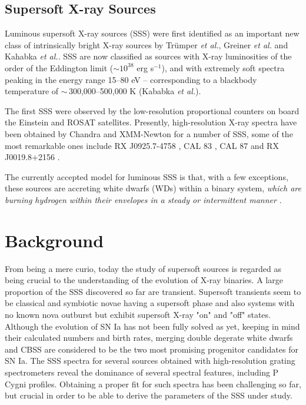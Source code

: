         \subsection{Supersoft X-ray Sources} \label{introduction:introduction:sss}
        	Luminous supersoft X-ray sources (SSS) were first identified as an important new class of intrinsically bright X-ray sources by Tr{\"u}mper \emph{et al.}\cite{trumper91}, Greiner \emph{et al.}\cite{greiner91} and Kahabka \emph{et al.}\cite{kahabka06}. SSS are now classified as sources with X-ray luminosities of the order of the Eddington limit ($\sim 10^{38}$ erg s$^{-1}$), and with extremely soft spectra peaking in the energy range 15--80 eV -- corresponding to a blackbody temperature of $\sim\,$300,000--500,000 K (Kababka \emph{et al.})\cite{kahabka97}.
        	
        	The first SSS were observed by the low-resolution proportional counters on board the Einstein and ROSAT satellites. Presently, high-resolution X-ray spectra have been obtained by Chandra and XMM-Newton for a number of SSS, some of the most remarkable ones include RX J0925.7-4758 \cite{bearda2002,motch2002}, CAL 83 \cite{lanz2005}, CAL 87 \cite{orio2004} and RX J0019.8+2156 \cite{schwarz2004}.
        	
        	The currently accepted model for luminous SSS is that, with a few exceptions, these sources are accreting white dwarfs (WDs) within a binary system, \emph{which are burning hydrogen within their envelopes in a steady or intermittent manner} \cite{vandenHeuvel92}.
    
    \section{Background} \label{introduction:background}
        From being a mere curio, today the study of supersoft sources is regarded as being crucial to the understanding of the evolution of X-ray binaries. A large proportion of the SSS discovered so far are transient. Supersoft transients seem to be classical and symbiotic novae having a supersoft phase and also systems with no known nova outburst but exhibit supersoft X-ray "on" and "off" states. Although the evolution of SN Ia has not been fully solved as yet, keeping in mind their calculated numbers and birth rates, merging double degerate white dwarfs and CBSS are considered to be the two most promising progenitor candidates for SN Ia. The SSS spectra for several sources obtained with high-resolution grating spectrometers reveal the dominance of several spectral features, including P Cygni profiles. Obtaining a proper fit for such spectra has been challenging so far, but crucial in order to be able to derive the parameters of the SSS under study.
    
